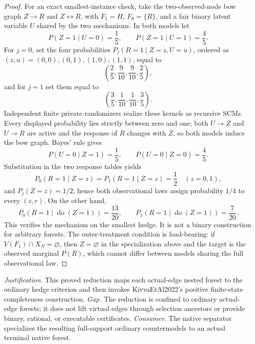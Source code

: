 \documentclass{article}
\begin{document}
\begin{proof}
For an exact smallest-instance check, take the two-observed-node bow graph \(Z\to R\) and \(Z\leftrightarrow R\), with \(F_1=H\), \(F_0=\{R\}\), and a fair binary latent variable \(U\) shared by the two mechanisms. In both models let
\[
 P(Z=1\mid U=0)=\frac15,
 \qquad
 P(Z=1\mid U=1)=\frac45.
\]
For \(j=0\), set the four probabilities \(P_j(R=1\mid Z=z,U=u)\), ordered as \((z,u)=(0,0),(0,1),(1,0),(1,1)\), equal to
\[
 \left(\frac25,\frac9{10},\frac9{10},\frac25\right),
\]
and for \(j=1\) set them equal to
\[
 \left(\frac35,\frac1{10},\frac1{10},\frac35\right).
\]
Independent finite private randomizers realize these kernels as recursive SCMs. Every displayed probability lies strictly between zero and one; both \(U\to Z\) and \(U\to R\) are active and the response of \(R\) changes with \(Z\), so both models induce the bow graph. Bayes' rule gives
\[
 P(U=0\mid Z=1)=\frac15,
 \qquad
 P(U=0\mid Z=0)=\frac45.
\]
Substitution in the two response tables yields
\[
 P_0(R=1\mid Z=z)=P_1(R=1\mid Z=z)=\frac12
 \quad (z=0,1),
\]
and \(P_j(Z=z)=1/2\); hence both observational laws assign probability \(1/4\) to every \((z,r)\). On the other hand,
\[
 P_0(R=1\mid\operatorname{do}(Z=1))=\frac{13}{20},
 \qquad
 P_1(R=1\mid\operatorname{do}(Z=1))=\frac7{20}.
\]
This verifies the mechanism on the smallest hedge. It is not a binary construction for arbitrary forests. The outer-treatment condition is load-bearing: if \(V(F_1)\cap X_N=\varnothing\), then \(Z=\varnothing\) in the specialization above and the target is the observed marginal \(P(R)\), which cannot differ between models sharing the full observational law.
\end{proof}
\par\smallskip\noindent \textit{Justification.} This proved reduction maps each actual-edge nested forest to the ordinary hedge criterion and then invokes KivvaEtAl2022's positive finite-state completeness construction. \textit{Gap.} The reduction is confined to ordinary actual-edge forests; it does not lift virtual edges through selection ancestors or provide binary, rational, or executable certificates. \textit{Consumer.} The native separator specializes the resulting full-support ordinary countermodels to an actual terminal native forest.
\end{document}
